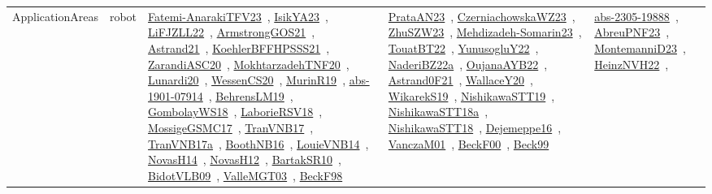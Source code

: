 {\begin{longtable}{lp{3cm}>{\raggedright\arraybackslash}p{6cm}>{\raggedright\arraybackslash}p{6cm}>{\raggedright\arraybackslash}p{8cm}}
ApplicationAreas & robot & \href{../works/Fatemi-AnarakiTFV23.pdf}{Fatemi-AnarakiTFV23}~\cite{Fatemi-AnarakiTFV23}, \href{../works/IsikYA23.pdf}{IsikYA23}~\cite{IsikYA23}, \href{../works/LiFJZLL22.pdf}{LiFJZLL22}~\cite{LiFJZLL22}, \href{../works/ArmstrongGOS21.pdf}{ArmstrongGOS21}~\cite{ArmstrongGOS21}, \href{../works/Astrand21.pdf}{Astrand21}~\cite{Astrand21}, \href{../works/KoehlerBFFHPSSS21.pdf}{KoehlerBFFHPSSS21}~\cite{KoehlerBFFHPSSS21}, \href{../works/ZarandiASC20.pdf}{ZarandiASC20}~\cite{ZarandiASC20}, \href{../works/MokhtarzadehTNF20.pdf}{MokhtarzadehTNF20}~\cite{MokhtarzadehTNF20}, \href{../works/Lunardi20.pdf}{Lunardi20}~\cite{Lunardi20}, \href{../works/WessenCS20.pdf}{WessenCS20}~\cite{WessenCS20}, \href{../works/MurinR19.pdf}{MurinR19}~\cite{MurinR19}, \href{../works/abs-1901-07914.pdf}{abs-1901-07914}~\cite{abs-1901-07914}, \href{../works/BehrensLM19.pdf}{BehrensLM19}~\cite{BehrensLM19}, \href{../works/GombolayWS18.pdf}{GombolayWS18}~\cite{GombolayWS18}, \href{../works/LaborieRSV18.pdf}{LaborieRSV18}~\cite{LaborieRSV18}, \href{../works/MossigeGSMC17.pdf}{MossigeGSMC17}~\cite{MossigeGSMC17}, \href{../works/TranVNB17.pdf}{TranVNB17}~\cite{TranVNB17}, \href{../works/TranVNB17a.pdf}{TranVNB17a}~\cite{TranVNB17a}, \href{../works/BoothNB16.pdf}{BoothNB16}~\cite{BoothNB16}, \href{../works/LouieVNB14.pdf}{LouieVNB14}~\cite{LouieVNB14}, \href{../works/NovasH14.pdf}{NovasH14}~\cite{NovasH14}, \href{../works/NovasH12.pdf}{NovasH12}~\cite{NovasH12}, \href{../works/BartakSR10.pdf}{BartakSR10}~\cite{BartakSR10}, \href{../works/BidotVLB09.pdf}{BidotVLB09}~\cite{BidotVLB09}, \href{../works/ValleMGT03.pdf}{ValleMGT03}~\cite{ValleMGT03}, \href{../works/BeckF98.pdf}{BeckF98}~\cite{BeckF98} & \href{../works/PrataAN23.pdf}{PrataAN23}~\cite{PrataAN23}, \href{../works/CzerniachowskaWZ23.pdf}{CzerniachowskaWZ23}~\cite{CzerniachowskaWZ23}, \href{../works/ZhuSZW23.pdf}{ZhuSZW23}~\cite{ZhuSZW23}, \href{../works/Mehdizadeh-Somarin23.pdf}{Mehdizadeh-Somarin23}~\cite{Mehdizadeh-Somarin23}, \href{../works/TouatBT22.pdf}{TouatBT22}~\cite{TouatBT22}, \href{../works/YunusogluY22.pdf}{YunusogluY22}~\cite{YunusogluY22}, \href{../works/NaderiBZ22a.pdf}{NaderiBZ22a}~\cite{NaderiBZ22a}, \href{../works/OujanaAYB22.pdf}{OujanaAYB22}~\cite{OujanaAYB22}, \href{../works/Astrand0F21.pdf}{Astrand0F21}~\cite{Astrand0F21}, \href{../works/WallaceY20.pdf}{WallaceY20}~\cite{WallaceY20}, \href{../works/WikarekS19.pdf}{WikarekS19}~\cite{WikarekS19}, \href{../works/NishikawaSTT19.pdf}{NishikawaSTT19}~\cite{NishikawaSTT19}, \href{../works/NishikawaSTT18a.pdf}{NishikawaSTT18a}~\cite{NishikawaSTT18a}, \href{../works/NishikawaSTT18.pdf}{NishikawaSTT18}~\cite{NishikawaSTT18}, \href{../works/Dejemeppe16.pdf}{Dejemeppe16}~\cite{Dejemeppe16}, \href{../works/VanczaM01.pdf}{VanczaM01}~\cite{VanczaM01}, \href{../works/BeckF00.pdf}{BeckF00}~\cite{BeckF00}, \href{../works/Beck99.pdf}{Beck99}~\cite{Beck99} & \href{../works/abs-2305-19888.pdf}{abs-2305-19888}~\cite{abs-2305-19888}, \href{../works/AbreuPNF23.pdf}{AbreuPNF23}~\cite{AbreuPNF23}, \href{../works/MontemanniD23.pdf}{MontemanniD23}~\cite{MontemanniD23}, \href{../works/HeinzNVH22.pdf}{HeinzNVH22}~\cite{HeinzNVH22}, 
\end{longtable}}
